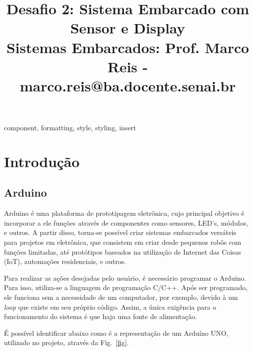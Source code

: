 \documentclass[conference]{IEEEtran}
\begin{document}
\title{Desafio 2: Sistema Embarcado com Sensor e Display\\
{\footnotesize Sistemas Embarcados: Prof. Marco Reis - marco.reis@ba.docente.senai.br}
}

\author{
}

\maketitle

\begin{abstract}

\end{abstract}
    
\begin{IEEEkeywords}
    component, formatting, style, styling, insert
\end{IEEEkeywords}
    
\section{Introdução}
\subsection{Arduino}

    Arduino é uma plataforma de prototipagem eletrônica, cujo principal objetivo é incorporar a ele 
funções através de componentes como sensores, LED's, módulos, e outros. A partir disso, torna-se 
possível criar sistemas embarcados versáteis para projetos em eletrônica, que consistem em criar desde 
pequenos robôs com funções limitadas, até protótipos baseados na utilização de Internet das Coisas (IoT),
automações residenciais, e outros.

    Para realizar as ações desejadas pelo usuário, é necessário programar o Arduino. Para isso, utiliza-se 
a linguagem de programação C/C++. Após ser programado, ele funciona sem a necessidade de um computador, por
exemplo, devido à um \emph{loop} que existe em seu próprio código. Assim, a única exigência para o
funcionamento do sistema é que haja uma fonte de alimentação.

    É possível identificar abaixo como é a representação de um Arduíno UNO, utilizado no projeto, através
da Fig.~\ref{fig}.
\end{document}
